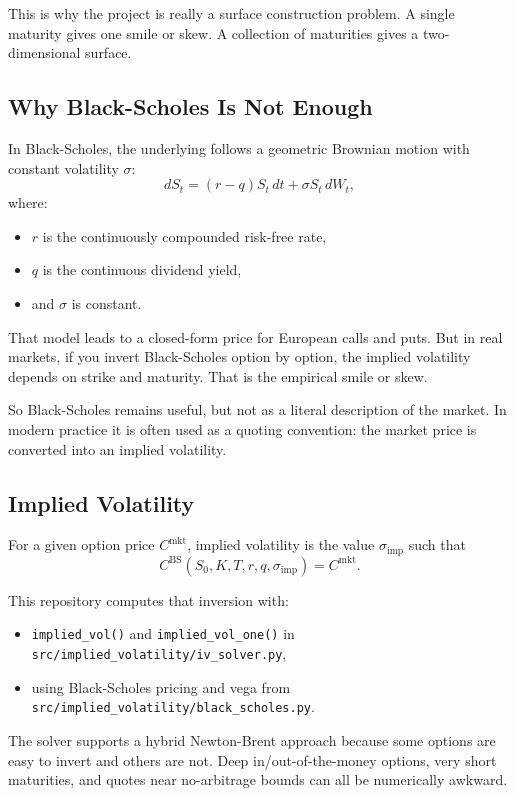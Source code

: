 \documentclass[11pt]{article}
\begin{document}
This is why the project is really a surface construction problem. A single maturity gives one smile or skew. A collection of maturities gives a two-dimensional surface.

\subsection{Why Black-Scholes Is Not Enough}

In Black-Scholes, the underlying follows a geometric Brownian motion with constant volatility $\sigma$:
\[
dS_t = (r-q)S_t\,dt + \sigma S_t\,dW_t,
\]
where:

\begin{itemize}
  \item $r$ is the continuously compounded risk-free rate,
  \item $q$ is the continuous dividend yield,
  \item and $\sigma$ is constant.
\end{itemize}

That model leads to a closed-form price for European calls and puts. But in real markets, if you invert Black-Scholes option by option, the implied volatility depends on strike and maturity. That is the empirical smile or skew.

So Black-Scholes remains useful, but not as a literal description of the market. In modern practice it is often used as a quoting convention: the market price is converted into an implied volatility.

\subsection{Implied Volatility}

For a given option price $C^{\text{mkt}}$, implied volatility is the value $\sigma_{\text{imp}}$ such that
\[
C^{\text{BS}}(S_0,K,T,r,q,\sigma_{\text{imp}})=C^{\text{mkt}}.
\]

This repository computes that inversion with:

\begin{itemize}
  \item \texttt{implied\_vol()} and \texttt{implied\_vol\_one()} in \texttt{src/implied\_volatility/iv\_solver.py},
  \item using Black-Scholes pricing and vega from \texttt{src/implied\_volatility/black\_scholes.py}.
\end{itemize}

The solver supports a hybrid Newton-Brent approach because some options are easy to invert and others are not. Deep in/out-of-the-money options, very short maturities, and quotes near no-arbitrage bounds can all be numerically awkward.
\end{document}
